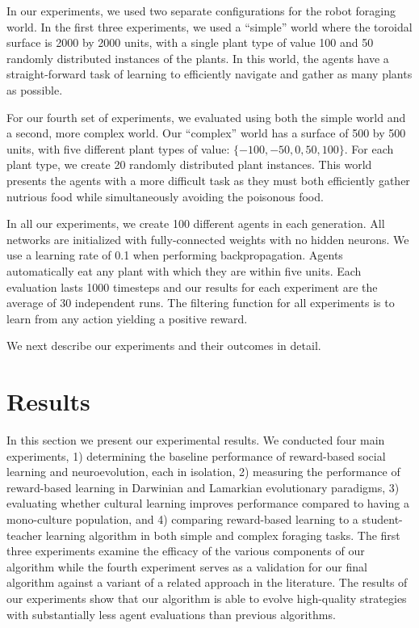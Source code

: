 \documentclass{acm_proc_article-sp}
\begin{document}
In our experiments, we used two separate configurations for the robot foraging world. In the first three experiments, we used a ``simple'' world where the toroidal surface is 2000 by 2000 units, with a single plant type of value 100 and 50 randomly distributed instances of the plants. In this world, the agents have a straight-forward task of learning to efficiently navigate and gather as many plants as possible.

For our fourth set of experiments, we evaluated using both the simple world and a second, more complex world. Our ``complex'' world has a surface of 500 by 500 units, with five different plant types of value: $\{-100, -50, 0, 50, 100\}$. For each plant type, we create 20 randomly distributed plant instances. This world presents the agents with a more difficult task as they must both efficiently gather nutrious food while simultaneously avoiding the poisonous food.

In all our experiments, we create 100 different agents in each generation. All networks are initialized with fully-connected weights with no hidden neurons. We use a learning rate of 0.1 when performing backpropagation. Agents automatically eat any plant with which they are within five units. Each evaluation lasts 1000 timesteps and our results for each experiment are the average of 30 independent runs. The filtering function for all experiments is to learn from any action yielding a positive reward.

We next describe our experiments and their outcomes in detail.


\section{Results}
\label{sec:results}
In this section we present our experimental results. We conducted four main experiments, 1) determining the baseline performance of reward-based social learning and neuroevolution, each in isolation, 2) measuring the performance of reward-based learning in Darwinian and Lamarkian evolutionary paradigms, 3) evaluating whether cultural learning improves performance compared to having a mono-culture population, and 4) comparing reward-based learning to a student-teacher learning algorithm in both simple and complex foraging tasks. The first three experiments examine the efficacy of the various components of our algorithm while the fourth experiment serves as a validation for our final algorithm against a variant of a related approach in the literature. The results of our experiments show that our algorithm is able to evolve high-quality strategies with substantially less agent evaluations than previous algorithms.
\end{document}
